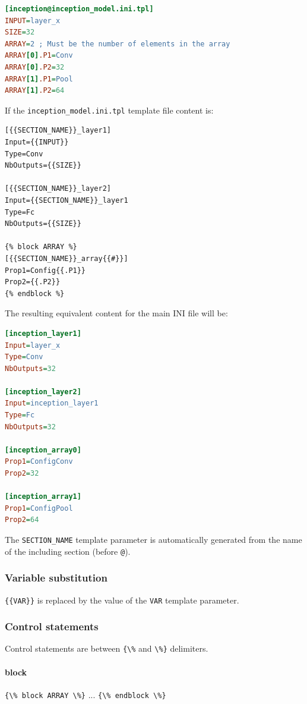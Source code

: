 \documentclass[a4paper,11pt,oneside]{article}
\begin{document}
\begin{lstlisting}[language=ini]
[inception@inception_model.ini.tpl]
INPUT=layer_x
SIZE=32
ARRAY=2 ; Must be the number of elements in the array
ARRAY[0].P1=Conv
ARRAY[0].P2=32
ARRAY[1].P1=Pool
ARRAY[1].P2=64
\end{lstlisting}

If the \lstinline!inception_model.ini.tpl! template file content is:

\begin{lstlisting}[language=tpl]
[{{SECTION_NAME}}_layer1]
Input={{INPUT}}
Type=Conv
NbOutputs={{SIZE}}

[{{SECTION_NAME}}_layer2]
Input={{SECTION_NAME}}_layer1
Type=Fc
NbOutputs={{SIZE}}

{% block ARRAY %}
[{{SECTION_NAME}}_array{{#}}]
Prop1=Config{{.P1}}
Prop2={{.P2}}
{% endblock %}
\end{lstlisting}

The resulting equivalent content for the main INI file will be:

\begin{lstlisting}[language=ini]
[inception_layer1]
Input=layer_x
Type=Conv
NbOutputs=32

[inception_layer2]
Input=inception_layer1
Type=Fc
NbOutputs=32

[inception_array0]
Prop1=ConfigConv
Prop2=32

[inception_array1]
Prop1=ConfigPool
Prop2=64
\end{lstlisting}

The \lstinline!SECTION_NAME! template parameter is automatically generated from
the name of the including section (before \lstinline!@!).


\subsubsection{Variable substitution}

\lstinline!{{VAR}}! is replaced by the value of the \lstinline!VAR! template
 parameter.


\subsubsection{Control statements}

Control statements are between \lstinline!{\%! and \lstinline!\%}! delimiters.

\paragraph{block}
\lstinline!{\% block ARRAY \%}! ...
\lstinline!{\% endblock \%}!
\end{document}
